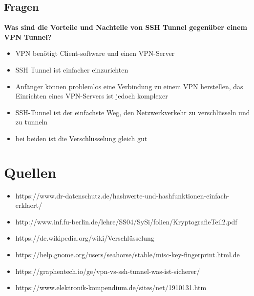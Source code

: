 \documentclass[12pt,a4paper]{article}
\begin{document}
\subsection{Fragen}
\textbf{Was sind die Vorteile und Nachteile von SSH Tunnel gegenüber einem VPN Tunnel?}
\begin{itemize}
    \item VPN benötigt Client-software und einen VPN-Server
	\item SSH Tunnel ist einfacher einzurichten
	\item Anfänger können problemlos eine Verbindung zu einem VPN herstellen, das Einrichten eines VPN-Servers ist jedoch komplexer
	\item SSH-Tunnel ist der einfachste Weg, den Netzwerkverkehr zu verschlüsseln und zu tunneln
	\item bei beiden ist die Verschlüsselung gleich gut 
\end{itemize}
\section{Quellen}
\begin{itemize}
    \item https://www.dr-datenschutz.de/hashwerte-und-hashfunktionen-einfach-erklaert/
    \item http://www.inf.fu-berlin.de/lehre/SS04/SySi/folien/KryptografieTeil2.pdf
    \item https://de.wikipedia.org/wiki/Verschlüsselung
    \item https://help.gnome.org/users/seahorse/stable/misc-key-fingerprint.html.de
    \item https://graphentech.io/ge/vpn-vs-ssh-tunnel-was-ist-sicherer/
    \item https://www.elektronik-kompendium.de/sites/net/1910131.htm
\end{itemize}
\end{document}
